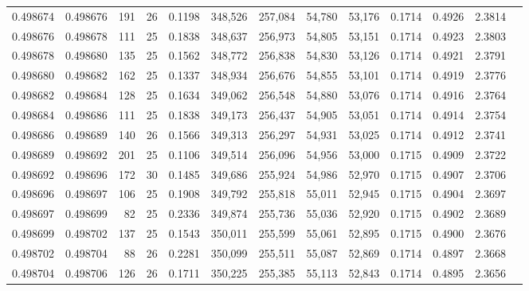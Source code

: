 \begin{tabular}{rrrrrrrrrrrrr}
0.498674 & 0.498676 & 191 &  26 &                                     0.1198 & 348,526 & 257,084 &  54,780 &  53,176 & 0.1714 & 0.4926 & 2.3814 \\
0.498676 & 0.498678 & 111 &  25 &                                     0.1838 & 348,637 & 256,973 &  54,805 &  53,151 & 0.1714 & 0.4923 & 2.3803 \\
0.498678 & 0.498680 & 135 &  25 &                                     0.1562 & 348,772 & 256,838 &  54,830 &  53,126 & 0.1714 & 0.4921 & 2.3791 \\
0.498680 & 0.498682 & 162 &  25 &                                     0.1337 & 348,934 & 256,676 &  54,855 &  53,101 & 0.1714 & 0.4919 & 2.3776 \\
0.498682 & 0.498684 & 128 &  25 &                                     0.1634 & 349,062 & 256,548 &  54,880 &  53,076 & 0.1714 & 0.4916 & 2.3764 \\
0.498684 & 0.498686 & 111 &  25 &                                     0.1838 & 349,173 & 256,437 &  54,905 &  53,051 & 0.1714 & 0.4914 & 2.3754 \\
0.498686 & 0.498689 & 140 &  26 &                                     0.1566 & 349,313 & 256,297 &  54,931 &  53,025 & 0.1714 & 0.4912 & 2.3741 \\
0.498689 & 0.498692 & 201 &  25 &                                     0.1106 & 349,514 & 256,096 &  54,956 &  53,000 & 0.1715 & 0.4909 & 2.3722 \\
0.498692 & 0.498696 & 172 &  30 &                                     0.1485 & 349,686 & 255,924 &  54,986 &  52,970 & 0.1715 & 0.4907 & 2.3706 \\
0.498696 & 0.498697 & 106 &  25 &                                     0.1908 & 349,792 & 255,818 &  55,011 &  52,945 & 0.1715 & 0.4904 & 2.3697 \\
0.498697 & 0.498699 &  82 &  25 &                                     0.2336 & 349,874 & 255,736 &  55,036 &  52,920 & 0.1715 & 0.4902 & 2.3689 \\
0.498699 & 0.498702 & 137 &  25 &                                     0.1543 & 350,011 & 255,599 &  55,061 &  52,895 & 0.1715 & 0.4900 & 2.3676 \\
0.498702 & 0.498704 &  88 &  26 &                                     0.2281 & 350,099 & 255,511 &  55,087 &  52,869 & 0.1714 & 0.4897 & 2.3668 \\
0.498704 & 0.498706 & 126 &  26 &                                     0.1711 & 350,225 & 255,385 &  55,113 &  52,843 & 0.1714 & 0.4895 & 2.3656 \\

\end{tabular}
